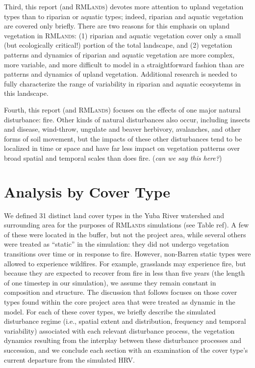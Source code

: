 Third, this report (and \textsc{RMLands}) devotes more attention to upland vegetation types than to riparian or aquatic types; indeed, riparian and aquatic vegetation are covered only briefly. There are two reasons for this emphasis on upland vegetation in \textsc{RMLands}: (1) riparian and aquatic vegetation cover only a small (but ecologically critical!) portion of the total landscape, and (2) vegetation patterns and dynamics of riparian and aquatic vegetation are more complex, more variable, and more difficult to model in a straightforward fashion than are patterns and dynamics of upland vegetation. Additional research is needed to fully characterize the range of variability in riparian and aquatic ecosystems in this landscape. 

Fourth, this report (and \textsc{RMLands}) focuses on the effects of one major natural disturbance: fire. Other kinds of natural disturbances also occur, including insects and disease, wind-throw, ungulate and beaver herbivory, avalanches, and other forms of soil movement, but the impacts of these other disturbances tend to be localized in time or space and have far less impact on vegetation patterns over broad spatial and temporal scales than does fire. (\emph{can we say this here?})

\section{Analysis by Cover Type}
We defined 31 distinct land cover types in the Yuba River watershed and surrounding area for the purposes of \textsc{RMLands} simulations (see Table ref{}). A few of these were located in the buffer, but not the project area, while several others were treated as ``static'' in the simulation: they did not undergo vegetation transitions over time or in response to fire. However, non-Barren static types were allowed to experience wildfires. For example, grasslands may experience fire, but because they are expected to recover from fire in less than five years (the length of one timestep in our simulation), we assume they remain constant in composition and structure. The discussion that follows focuses on those cover types found within the core project area that were treated as dynamic in the model. For each of these cover types, we briefly describe the simulated disturbance regime (i.e., spatial extent and distribution, frequency and temporal variability) associated with each relevant disturbance process, the vegetation dynamics resulting from the interplay between these disturbance processes and succession, and we conclude each section with an examination of the cover type’s current departure from the simulated HRV. 

